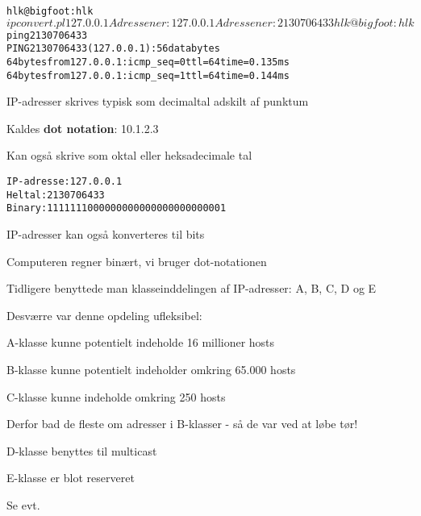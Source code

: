 \documentclass[Screen16to9,17pt]{foils}
\begin{document}

\begin{alltt}
hlk@bigfoot:hlk$ ipconvert.pl 127.0.0.1
Adressen er: 127.0.0.1
Adressen er: 2130706433
hlk@bigfoot:hlk$ ping 2130706433
PING 2130706433 (127.0.0.1): 56 data bytes
64 bytes from 127.0.0.1: icmp_seq=0 ttl=64 time=0.135 ms
64 bytes from 127.0.0.1: icmp_seq=1 ttl=64 time=0.144 ms
\end{alltt}

\begin{list1}
\item IP-adresser skrives typisk som decimaltal adskilt af punktum
\item Kaldes {\bf dot notation}: 10.1.2.3
\item Kan også skrive som oktal eller heksadecimale tal
\end{list1}




\begin{alltt}
IP-adresse: 127.0.0.1
Heltal:	2130706433
Binary:	1111111000000000000000000000001
\end{alltt}

\begin{list1}
\item IP-adresser kan også konverteres til bits
\item Computeren regner binært, vi bruger dot-notationen
\end{list1}


\begin{list1}
\item Tidligere benyttede man klasseinddelingen af IP-adresser: A, B, C, D og E
\item Desværre var denne opdeling ufleksibel:
\begin{list2}
\item A-klasse kunne potentielt indeholde 16 millioner hosts
\item B-klasse kunne potentielt indeholder omkring 65.000 hosts
\item C-klasse kunne indeholde omkring 250 hosts
\end{list2}
\item Derfor bad de fleste om adresser i B-klasser - så de var ved at løbe tør!
\item D-klasse benyttes til multicast
\item E-klasse er blot reserveret
\item Se evt. 
\end{list1}
\end{document}

